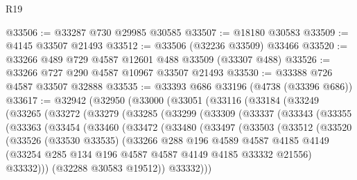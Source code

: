 \begin{lexlean}{R19}
\begin{coremodule}
@33506 := @33287 @730 @29985 @30585
@33507 := @18180 @30583
@33509 := @4145 @33507 @21493
@33512 := @33506 (@32236 @33509) @33466
@33520 := @33266 @489 @729 @4587 @12601 @488 @33509 (@33307 @488)
@33526 := @33266 @727 @290 @4587 @10967 @33507 @21493
@33530 := @33388 @726 @4587 @33507 @32888
@33535 := @33393 @686 @33196 (@4738 (@33396 @686))
@33617 := @32942
    (@32950
      (@33000
        (@33051
          (@33116
            (@33184
              (@33249
                (@33265
                  (@33272
                    (@33279
                      (@33285
                        (@33299
                          (@33309
                            (@33337
                              (@33343
                                (@33355
                                  (@33363
                                    (@33454
                                      (@33460
                                        (@33472
                                          (@33480
                                            (@33497
                                              (@33503
                                                (@33512
                                                  (@33520
                                                    (@33526
                                                      (@33530 @33535)
                                                      (@33266
                                                        @288
                                                        @196
                                                        @4589
                                                        @4587
                                                        @4185
                                                        @4149
                                                        (@33254
                                                          @285
                                                          @134
                                                          @196
                                                          @4587
                                                          @4587
                                                          @4149
                                                          @4185
                                                          @33332
                                                          @21556)
                                                        @33332)))
                                                  (@32288 @30583 @19512))
                                                @33332)))

\end{coremodule}
\end{lexlean}
